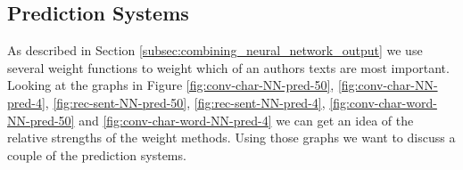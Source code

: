 \subsection{Prediction Systems}

As described in Section \ref{subsec:combining_neural_network_output} we
use several weight functions to weight which of an authors texts are most
important. Looking at the graphs in Figure \ref{fig:conv-char-NN-pred-50},
\ref{fig:conv-char-NN-pred-4}, \ref{fig:rec-sent-NN-pred-50},
\ref{fig:rec-sent-NN-pred-4}, \ref{fig:conv-char-word-NN-pred-50} and
\ref{fig:conv-char-word-NN-pred-4} we can get an idea of the relative strengths
of the weight methods. Using those graphs we want to discuss a couple of the
prediction systems.

